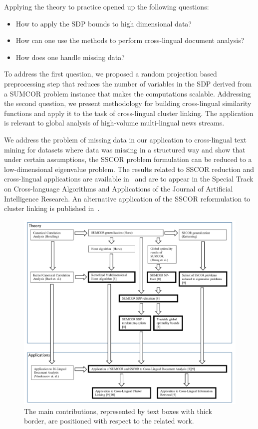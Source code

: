 Applying the theory to practice opened up the following questions:
\begin{itemize}
\item How to apply the SDP bounds to high dimensional data?
\item How can one use the methods to perform cross-lingual document analysis?
\item How does one handle missing data?
\end{itemize}
To address the first question, we proposed a random projection based preprocessing step that reduces the number
of variables in the SDP derived from a SUMCOR problem instance that makes the computations scalable. Addressing
the second question, we present methodology for building cross-lingual similarity functions and apply it
to the task of cross-lingual cluster linking. The application is relevant to global analysis of high-volume
multi-lingual news streams.

We address the problem of missing data in our application to cross-lingual text mining for datasets where
data was missing in a structured way and show that under certain assumptions, the SSCOR problem formulation
can be reduced to a low-dimensional eigenvalue problem. The results related to SSCOR reduction and
cross-lingual applications are available in~\cite{2015arXiv151207046R} and are to appear in the
Special Track on Cross-language Algorithms and Applications of the Journal of Artificial Intelligence Research.
An alternative application of the SSCOR reformulation to cluster linking is published in~\cite{Belyaeva201564}.

\begin{figure}[t]
\centering
\includegraphics[width=1\textwidth]{figures/position_of_work.pdf}
\caption{\label{fig:position_of_work} The main contributions, represented by text boxes with thick border, are
positioned with respect to the related work.}
\end{figure}

